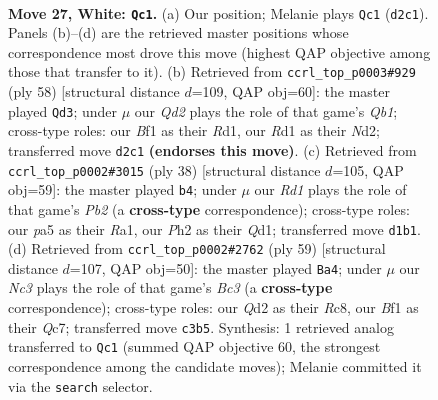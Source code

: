 \documentclass[11pt]{article}
\begin{document}
\clearpage

\begin{figure}[p]\centering
\begin{subfigure}{0.46\textwidth}\centering
\resizebox{\linewidth}{!}{%
\newchessgame
\chessboard[
  setfen={1nb1q1r1/rp4k1/2p1p3/p2p1p1p/Pn1P1P1N/2N3P1/1PPQ1K1P/3R1B1R w - - 7 27},
  showmover=false,
  pgfstyle=straightmove, color=movearrow, markmove={d2-c1}
]}
\caption{}
\end{subfigure}\hfill
\begin{subfigure}{0.46\textwidth}\centering
\resizebox{\linewidth}{!}{%
\newchessgame
\chessboard[
  setfen={2r2b2/1q3p1k/pp2rnpp/n1p1p3/P3P3/N1P1B2P/1P1N1PP1/RQ1R2K1 w - - 2 30},
  showmover=false,
  pgfstyle=straightmove, color=movearrow, markmove={b1-d3}
]}
\caption{}
\end{subfigure}
\\[4pt]
\begin{subfigure}{0.46\textwidth}\centering
\resizebox{\linewidth}{!}{%
\newchessgame
\chessboard[
  setfen={1r2r1k1/3qbppp/3pn3/1pp1p3/4P2P/2PPBNP1/1P3P2/R2QR1K1 w - - 1 20},
  showmover=false,
  pgfstyle=straightmove, color=movearrow, markmove={b2-b4}
]}
\caption{}
\end{subfigure}\hfill
\begin{subfigure}{0.46\textwidth}\centering
\resizebox{\linewidth}{!}{%
\newchessgame
\chessboard[
  setfen={2r3k1/2q2pp1/1pbpp2p/4n3/1PP1P3/r3NP1P/5QP1/1R1R1B1K b - - 4 30},
  showmover=false,
  pgfstyle=straightmove, color=movearrow, markmove={c6-a4}
]}
\caption{}
\end{subfigure}
\caption{\textbf{Move 27, White: \texttt{Qc1}.} (a) Our position; Melanie plays \texttt{Qc1} (\texttt{d2c1}). Panels (b)--(d) are the retrieved master positions whose correspondence most drove this move (highest QAP objective among those that transfer to it). (b) Retrieved from \texttt{ccrl\_top\_p0003\#929} (ply 58) [structural distance $d$=109, QAP obj=60]: the master played \texttt{Qd3}; under $\mu$ our \emph{Qd2} plays the role of that game's \emph{Qb1}; cross-type roles: our \emph{B}f1 as their \emph{R}d1, our \emph{R}d1 as their \emph{N}d2; transferred move \texttt{d2c1} \textbf{(endorses this move)}. (c) Retrieved from \texttt{ccrl\_top\_p0002\#3015} (ply 38) [structural distance $d$=105, QAP obj=59]: the master played \texttt{b4}; under $\mu$ our \emph{Rd1} plays the role of that game's \emph{Pb2} (a \textbf{cross-type} correspondence); cross-type roles: our \emph{p}a5 as their \emph{R}a1, our \emph{P}h2 as their \emph{Q}d1; transferred move \texttt{d1b1}. (d) Retrieved from \texttt{ccrl\_top\_p0002\#2762} (ply 59) [structural distance $d$=107, QAP obj=50]: the master played \texttt{Ba4}; under $\mu$ our \emph{Nc3} plays the role of that game's \emph{Bc3} (a \textbf{cross-type} correspondence); cross-type roles: our \emph{Q}d2 as their \emph{R}c8, our \emph{B}f1 as their \emph{Q}c7; transferred move \texttt{c3b5}. Synthesis: 1 retrieved analog transferred to \texttt{Qc1} (summed QAP objective 60, the strongest correspondence among the candidate moves); Melanie committed it via the \texttt{search} selector.}
\label{fig:thought-m52}
\end{figure}
\end{document}
